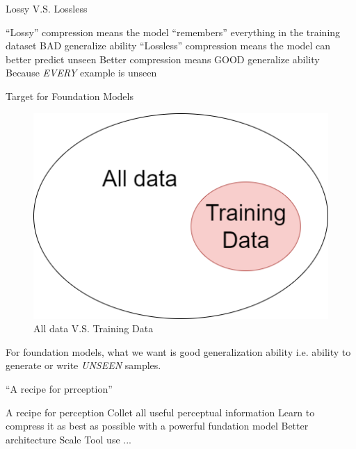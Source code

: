 \documentclass[scheme=plain]{ctexbeamer}
\begin{document}
\begin{frame}{Lossy V.S. Lossless}
  \begin{outline}
    \1 ``Lossy'' compression means the model ``remembers'' everything in the training dataset
      \2 BAD generalize ability
    \1 ``Lossless'' compression means the model can better predict unseen 
      \2 Better compression means GOOD generalize ability
        \3 Because \emph{EVERY} example is unseen
  \end{outline}
\end{frame}

\begin{frame}{Target for Foundation Models}
  \begin{figure}
    \includegraphics[width=.6\linewidth]{target_for_foundation_models.drawio.png}
    \caption{All data V.S. Training Data}
  \end{figure}
  \begin{outline}
    \1 For foundation models, what we want is good generalization ability
      \2 i.e. ability to generate or write \emph{UNSEEN} samples.
  \end{outline}
\end{frame}

\begin{frame}{``A recipe for prrception''}
  \begin{outline}
    \0 A recipe for perception
      \1 Collet all useful perceptual information
      \1 Learn to compress it as best as possible with a powerful fundation model
        \2 Better architecture
        \2 Scale
        \2 Tool use
        \2 ...
  \end{outline}
\end{frame}
\end{document}
